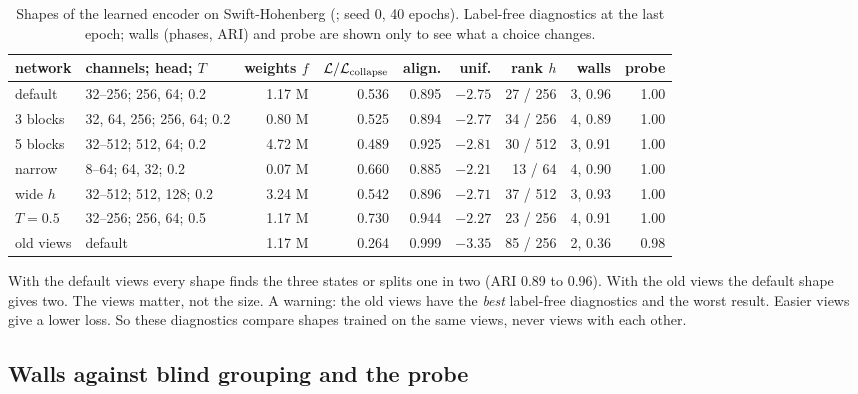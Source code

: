 \documentclass[11pt,a4paper]{article}
\newcommand{\repo}{https://github.com/Lu-Dumoulin/PhaseWall}
\newcommand{\srcref}[1]{\href{\repo/blob/main/#1}{\texttt{\detokenize{#1}}}}
\begin{document}
\begin{table}[H]
\centering\footnotesize
\setlength{\tabcolsep}{3.5pt}
\begin{tabular}{@{}l>{\raggedright}p{2.6cm}rrrrrrr@{}}
\toprule
network & channels; head; $T$ & weights $f$ & $\mathcal L/\mathcal L_{\rm collapse}$ & align. & unif. & rank $h$ & walls & probe \\
\midrule
default & 32--256; 256, 64; 0.2 & 1.17 M & 0.536 & 0.895 & $-2.75$ & 27 / 256 & 3, 0.96 & 1.00 \\
3 blocks & 32, 64, 256; 256, 64; 0.2 & 0.80 M & 0.525 & 0.894 & $-2.77$ & 34 / 256 & 4, 0.89 & 1.00 \\
5 blocks & 32--512; 512, 64; 0.2 & 4.72 M & 0.489 & 0.925 & $-2.81$ & 30 / 512 & 3, 0.91 & 1.00 \\
narrow & 8--64; 64, 32; 0.2 & 0.07 M & 0.660 & 0.885 & $-2.21$ & 13 / 64 & 4, 0.90 & 1.00 \\
wide $h$ & 32--512; 512, 128; 0.2 & 3.24 M & 0.542 & 0.896 & $-2.71$ & 37 / 512 & 3, 0.93 & 1.00 \\
$T=0.5$ & 32--256; 256, 64; 0.5 & 1.17 M & 0.730 & 0.944 & $-2.27$ & 23 / 256 & 4, 0.91 & 1.00 \\
\addlinespace
old views & default & 1.17 M & 0.264 & 0.999 & $-3.35$ & 85 / 256 & 2, 0.36 & 0.98 \\
\bottomrule
\end{tabular}
\caption{Shapes of the learned encoder on Swift-Hohenberg (\srcref{scripts/compare_networks.py}; seed 0, 40 epochs).
Label-free diagnostics at the last epoch; walls (phases, ARI) and probe are shown only to see what a choice
changes.}\label{tab:networks}
\end{table}

\begin{tech}
With the default views every shape finds the three states or splits one in two (ARI 0.89 to 0.96). With the old views
the default shape gives two. The views matter, not the size. A warning: the old views have the \emph{best} label-free
diagnostics and the worst result. Easier views give a lower loss. So these diagnostics compare shapes trained on the
same views, never views with each other.
\end{tech}

\subsection{Walls against blind grouping and the probe}\label{sec:sh-blind}
\end{document}
